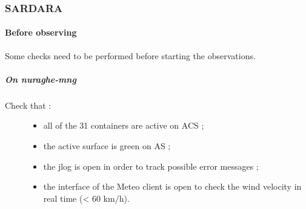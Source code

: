 \documentclass[letterpaper,10pt,english]{sphinxmanual}
\begin{document}
\subsubsection{SARDARA}
\label{SpectralLine/L-band/SARDARA/index:sardara}\label{SpectralLine/L-band/SARDARA/index::doc}

\paragraph{Before observing}
\label{SpectralLine/L-band/SARDARA/before-obs:before-observing}\label{SpectralLine/L-band/SARDARA/before-obs::doc}
Some checks need to be performed before starting the observations.


\subparagraph{On nuraghe-mng}
\label{SpectralLine/L-band/SARDARA/before-obs:on-nuraghe-mng}\begin{description}
\item[{Check that :}] \leavevmode\begin{itemize}
\item {} 
all of the 31 containers are active on ACS ;

\item {} 
the active surface is green on AS ;

\item {} 
the jlog is open in order to track possible error messages ;

\item {} 
the interface of the Meteo client is open to check the wind velocity in real time (\textless{} 60 km/h).

\end{itemize}

\end{description}
\end{document}

